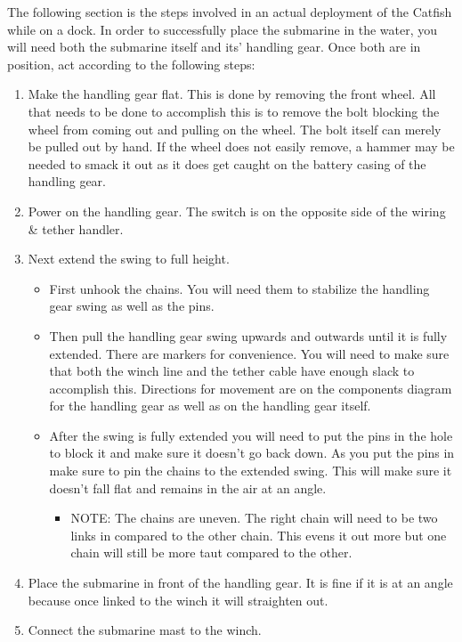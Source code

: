 \documentclass[
18pt, %
a4paper, %
oneside, %
headinclude,footinclude, %
]{scrartcl}
\begin{document}
The following section is the steps involved in an actual deployment of the Catfish while on a dock. In order to successfully place the submarine in the water, you will need both the submarine itself and its' handling gear. Once both are in position, act according to the following steps:

\begin{enumerate}
	\item Make the handling gear flat. This is done by removing the front wheel. All that needs to be done to accomplish this is to remove the bolt blocking the wheel from coming out and pulling on the wheel. The bolt itself can merely be pulled out by hand. If the wheel does not easily remove, a hammer may be needed to smack it out as it does get caught on the battery casing of the handling gear.
	\item Power on the handling gear. The switch is on the opposite side of the wiring \& tether handler.
	\item Next extend the swing to full height.
	\begin{itemize}
		\item First unhook the chains. You will need them to stabilize the handling gear swing as well as the pins.
		\item Then pull the handling gear swing upwards and outwards until it is fully extended. There are markers for convenience. You will need to make sure that both the winch line and the tether cable have enough slack to accomplish this. Directions for movement are on the components diagram for the handling gear as well as on the handling gear itself.
		\item After the swing is fully extended you will need to put the pins in the hole to block it and make sure it doesn't go back down. As you put the pins in make sure to pin the chains to the extended swing. This will make sure it doesn't fall flat and remains in the air at an angle.
		\begin{itemize}
			\item NOTE: The chains are uneven. The right chain will need to be two links in compared to the other chain. This evens it out more but one chain will still be more taut compared to the other.
		\end{itemize}
	\end{itemize}	
	\item Place the submarine in front of the handling gear. It is fine if it is at an angle because once linked to the winch it will straighten out. 
	\item Connect the submarine mast to the winch.

\end{enumerate}
\end{document}
